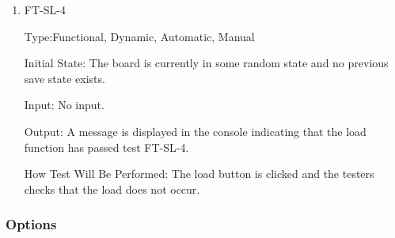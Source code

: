 \documentclass[12pt, titlepage]{article}
\begin{document}
\begin{enumerate}
	\item FT-SL-4

	      Type:Functional, Dynamic, Automatic, {\color {blue} Manual}

	      Initial State: The board is currently in some random state and no previous save state exists.

	      Input: No input.

	      Output:  A message is displayed in the console indicating that the  load function has passed test  FT-SL-4. 

	      How Test Will Be Performed: {\color {blue} The load button is clicked and the testers checks that the load does not occur.}
\end{enumerate}
\subsubsection { Options}
\end{document}
